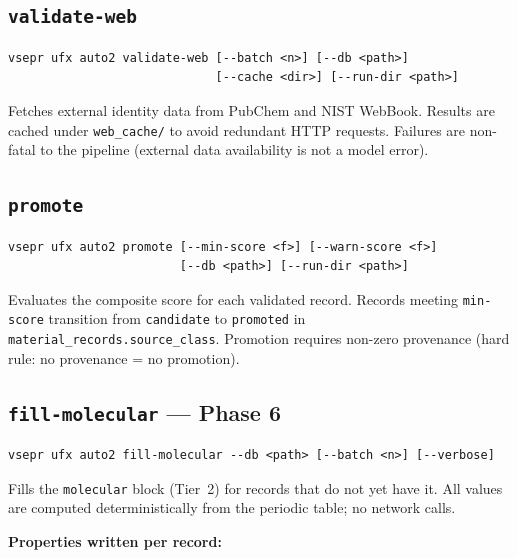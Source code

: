 \documentclass[11pt,letterpaper]{article}
\begin{document}
\subsection{\texttt{validate-web}}

\begin{lstlisting}
vsepr ufx auto2 validate-web [--batch <n>] [--db <path>]
							 [--cache <dir>] [--run-dir <path>]
\end{lstlisting}

Fetches external identity data from PubChem and NIST WebBook.  Results
are cached under \texttt{web\_cache/} to avoid redundant HTTP requests.
Failures are non-fatal to the pipeline (external data availability is not
a model error).

\subsection{\texttt{promote}}

\begin{lstlisting}
vsepr ufx auto2 promote [--min-score <f>] [--warn-score <f>]
						[--db <path>] [--run-dir <path>]
\end{lstlisting}

Evaluates the composite score for each validated record.  Records meeting
\texttt{min-score} transition from \texttt{candidate} to \texttt{promoted}
in \texttt{material\_records.source\_class}.  Promotion requires non-zero
provenance (hard rule: no provenance = no promotion).

\subsection{\texttt{fill-molecular} --- Phase 6}

\begin{lstlisting}
vsepr ufx auto2 fill-molecular --db <path> [--batch <n>] [--verbose]
\end{lstlisting}

Fills the \texttt{molecular} block (Tier~2) for records that do not yet
have it.  All values are computed deterministically from the periodic
table; no network calls.

\textbf{Properties written per record:}
\end{document}
